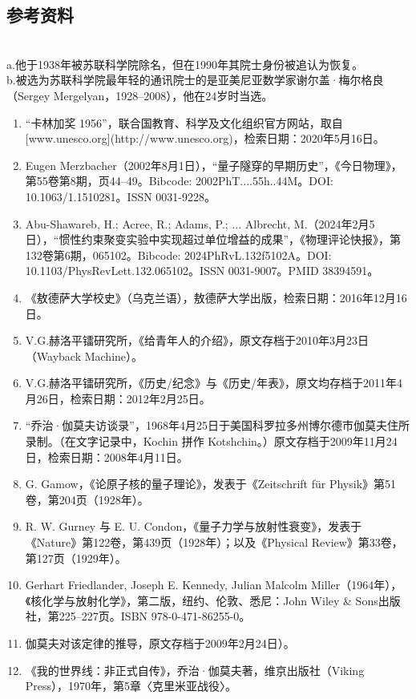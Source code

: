 \subsection{参考资料}\\
a.他于1938年被苏联科学院除名，但在1990年其院士身份被追认为恢复。\\
b.被选为苏联科学院最年轻的通讯院士的是亚美尼亚数学家谢尔盖·梅尔格良（Sergey Mergelyan，1928–2008），他在24岁时当选。
\begin{enumerate}
\item “卡林加奖 1956”，联合国教育、科学及文化组织官方网站，取自 [www.unesco.org](http://www.unesco.org)，检索日期：2020年5月16日。
\item Eugen Merzbacher（2002年8月1日），“量子隧穿的早期历史”，《今日物理》，第55卷第8期，页44–49。Bibcode: 2002PhT....55h..44M。DOI: 10.1063/1.1510281。ISSN 0031-9228。
\item Abu-Shawareb, H.; Acree, R.; Adams, P.; ... Albrecht, M.（2024年2月5日），“惯性约束聚变实验中实现超过单位增益的成果”，《物理评论快报》，第132卷第6期，065102。Bibcode: 2024PhRvL.132f5102A。DOI: 10.1103/PhysRevLett.132.065102。ISSN 0031-9007。PMID 38394591。
\item 《敖德萨大学校史》（乌克兰语），敖德萨大学出版，检索日期：2016年12月16日。
\item V.G.赫洛平镭研究所，《给青年人的介绍》，原文存档于2010年3月23日（Wayback Machine）。
\item V.G.赫洛平镭研究所，《历史/纪念》与《历史/年表》，原文均存档于2011年4月26日，检索日期：2012年2月25日。
\item “乔治·伽莫夫访谈录”，1968年4月25日于美国科罗拉多州博尔德市伽莫夫住所录制。（在文字记录中，Kochin 拼作 Kotshchin。）原文存档于2009年11月24日，检索日期：2008年4月11日。
\item G. Gamow，《论原子核的量子理论》，发表于《Zeitschrift für Physik》第51卷，第204页（1928年）。
\item R. W. Gurney 与 E. U. Condon，《量子力学与放射性衰变》，发表于《Nature》第122卷，第439页（1928年）；以及《Physical Review》第33卷，第127页（1929年）。
\item Gerhart Friedlander, Joseph E. Kennedy, Julian Malcolm Miller（1964年），《核化学与放射化学》，第二版，纽约、伦敦、悉尼：John Wiley & Sons出版社，第225–227页。ISBN 978-0-471-86255-0。
\item 伽莫夫对该定律的推导，原文存档于2009年2月24日）。
\item 《我的世界线：非正式自传》，乔治·伽莫夫著，维京出版社（Viking Press），1970年，第5章〈克里米亚战役〉。

\end{enumerate}
